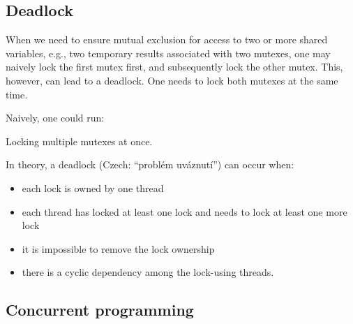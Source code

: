\subsection{Deadlock}

When we need to ensure mutual exclusion for access to two or more shared variables, 
e.g., two temporary results associated with two mutexes, 
one may naively lock the first mutex first, and subsequently lock the other mutex. This, however, 
can lead to a deadlock. One needs to lock both mutexes at the same time.  

Naively, one could run:

\raggedbottom
\begin{codebox}[]{\href{https://godbolt.org/z/s7Yj9M5vf}{\ExternalLink}}
\footnotesize Locking multiple mutexes at once.
\tcblower
{}
\end{codebox}

In theory, a deadlock (Czech: ``problém uváznutí'') can occur when:
\begin{itemize}
\item each lock is owned by one thread
\item each thread has locked at least one lock and needs to lock at least one more lock
\item it is impossible to remove the lock ownership
\item there is a cyclic dependency among the lock-using threads.
\end{itemize}

\subsection{Concurrent programming}

